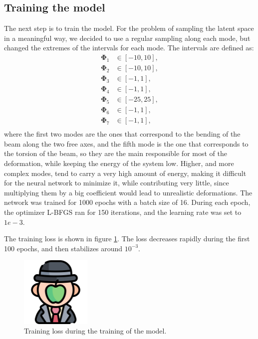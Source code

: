 \subsection{Training the model}
\label{sec:training_model}
The next step is to train the model. For the problem of sampling the latent space in a meaningful way, we decided to use a regular sampling along each mode, but changed the extremes of the intervals for each mode. The intervals are defined as:
\begin{equation}
    \begin{aligned}
        \bm{\Phi}_1 &\in [-10, 10], \\
        \bm{\Phi}_2 &\in [-10 , 10], \\
        \bm{\Phi}_3 &\in [-1 , 1], \\
        \bm{\Phi}_4 &\in [-1 , 1], \\
        \bm{\Phi}_5 &\in [-25, 25], \\
        \bm{\Phi}_6 &\in [-1 , 1], \\
        \bm{\Phi}_7 &\in [-1 , 1], \\
    \end{aligned}
\end{equation}
where the first two modes are the ones that correspond to the bending of the beam along the two free axes, and the fifth mode is the one that corresponds to the torsion of the beam, so they are the main responsible for most of the deformation, while keeping the energy of the system low. Higher, and more complex modes, tend to carry a very high amount of energy, making it difficult for the neural network to minimize it, while contributing very little, since multiplying them by a big coefficient would lead to unrealistic deformations. The network was trained for 1000 epochs with a batch size of 16. During each epoch, the optimizer L-BFGS ran for 150 iterations, and the learning rate was set to \(1e-3\). 

The training loss is shown in figure \ref{fig:training_loss}. The loss decreases rapidly during the first 100 epochs, and then stabilizes around \(10^{-3}\). 
\begin{figure}[H]
    \centering
    \includegraphics[width=0.3\textwidth]{Images/dummy.png}
    \caption{Training loss during the training of the model.}
    \label{fig:training_loss}
\end{figure}

